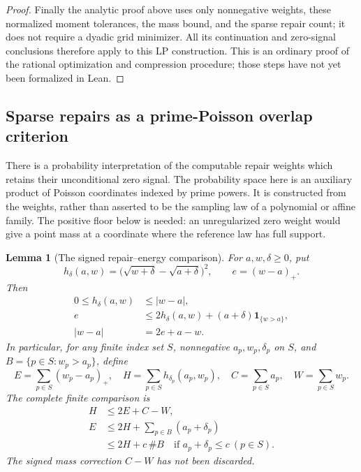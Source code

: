 \documentclass[11pt]{article}
\newtheorem{lemma}[theorem]{Lemma}
\theoremstyle{definition}
\begin{document}
\begin{proof}
Finally the analytic proof above uses only nonnegative
weights, these normalized moment tolerances, the mass bound,
and the sparse repair count; it does not require a dyadic
grid minimizer. All its continuation and zero-signal
conclusions therefore apply to this LP construction.
This is an ordinary proof of the rational optimization and
compression procedure; those steps have not yet been
formalized in Lean.
\end{proof}

\subsection{Sparse repairs as a prime-Poisson overlap criterion}
\label{sec:prime-poisson-repair-RH}

There is a probability interpretation of the computable repair
weights which retains their unconditional zero signal.
The probability space here is an auxiliary product of Poisson
coordinates indexed by prime powers. It is constructed from
the weights, rather than asserted to be the sampling law of a
polynomial or affine family. The positive floor below is needed:
an unregularized zero weight would give a point mass at a
coordinate where the reference law has full support.

\begin{lemma}[The signed repair--energy comparison]
\label{prop:signed-repair-Hellinger}
For $a,w,\delta\ge0$, put
\[
 h_\delta(a,w)=
   \bigl(\sqrt{w+\delta}-\sqrt{a+\delta}\bigr)^2,\qquad
 e=(w-a)_+.
\]
Then
\begin{equation}
 \begin{aligned}
 0\le h_\delta(a,w)&\le |w-a|,\\
 e&\le2h_\delta(a,w)
           +(a+\delta)\boldsymbol 1_{\{w>a\}},\\
 |w-a|&=2e+a-w.
 \end{aligned}
 \label{eq:signed-repair-Hellinger-scalar}
\end{equation}
In particular, for any finite index set $S$, nonnegative
$a_p,w_p,\delta_p$ on $S$, and
$B=\{p\in S:w_p>a_p\}$, define
\[
 E=\sum_{p\in S}(w_p-a_p)_+,\quad
 H=\sum_{p\in S}h_{\delta_p}(a_p,w_p),\quad
 C=\sum_{p\in S}a_p,\quad W=\sum_{p\in S}w_p.
\]
The complete finite comparison is
\begin{equation}
 \begin{aligned}
 H&\le2E+C-W,\\
 E&\le2H+\sum_{p\in B}(a_p+\delta_p)\\
  &\le2H+c\,\#B
       \quad\text{if }a_p+\delta_p\le c\ (p\in S).
 \end{aligned}
 \label{eq:signed-repair-Hellinger-sum}
\end{equation}
The signed mass correction $C-W$ has not been discarded.
\end{lemma}
\end{document}
